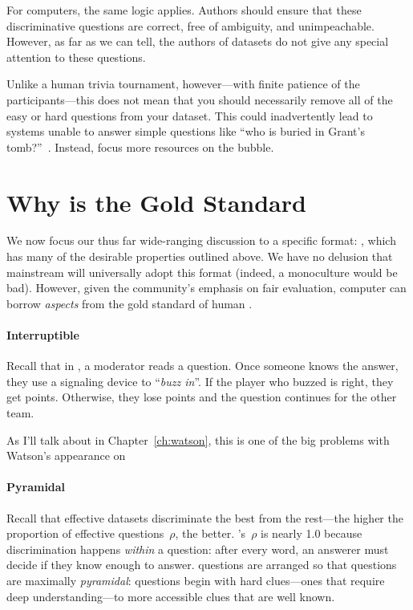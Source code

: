 For computers, the same logic applies.
Authors should ensure that these discriminative questions are correct, free of ambiguity, and unimpeachable.
However, as far as we can tell, the authors of \qa{} datasets do not give any special attention to these questions.

Unlike a human trivia tournament, however---with finite patience of the participants---this does not mean that you should necessarily remove all of the easy or hard questions from your dataset.
This could inadvertently lead to systems unable to answer simple questions like ``who is buried in Grant's tomb?''~\cite[Chapter 7]{dwan-00}.
Instead, focus more resources on the bubble.


\section{Why \qb{} is the Gold Standard}
\label{sec:qb}

We now focus our thus far wide-ranging  discussion to a specific format: \qb{}, which has many of the desirable properties outlined above.
We have no delusion that mainstream  will universally adopt this format (indeed, a monoculture would be bad).
However, given the community's emphasis on fair evaluation, computer  can borrow \emph{aspects} from the gold standard of human .

\paragraph{Interruptible}

Recall that in \qb{}, a moderator reads a question.
Once someone knows the answer, they use a signaling device to ``\emph{buzz in}''.
If the player who buzzed is right, they get points.
Otherwise, they lose points and the question continues for the other team.

As I'll talk about in Chapter~\ref{ch:watson}, this is one of the big problems with  Watson's appearance on \jeopardyp{}

\paragraph{Pyramidal}
\label{sec:pyramidality}

Recall that effective datasets discriminate the best
from the rest---the higher the proportion of effective
questions~$\rho$, the better.
\qb{}'s~$\rho$ is nearly 1.0 because discrimination happens
\emph{within} a question: after every word, an answerer must decide
if they know enough to answer.
\qb{} questions are arranged so that questions are maximally \emph{pyramidal}: questions begin with hard clues---ones that require deep understanding---to more accessible clues that are well known.


